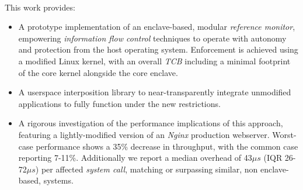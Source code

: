 \paragraph{} This work provides:
\begin{itemize}
    \item A prototype implementation of an enclave-based, modular \textit{reference monitor}, empowering \textit{information flow control} techniques to operate with autonomy and protection from the host operating system. Enforcement is achieved using a modified Linux kernel, with an overall \textit{TCB} including a minimal footprint of the core kernel alongside the core enclave.
    \item A userspace interposition library to near-transparently integrate unmodified applications to fully function under the new restrictions.
    \item A rigorous investigation of the performance implications of this approach, featuring a lightly-modified version of an \textit{Nginx} production webserver. Worst-case performance shows a 35\% decrease in throughput, with the common case reporting 7-11\%. Additionally we report a median overhead of 43$\mu s$ (IQR 26-72$\mu s$) per affected \textit{system call}, matching or surpassing similar, non enclave-based, systems.
\end{itemize}